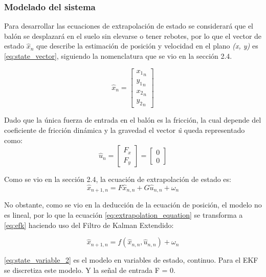 		\subsubsection*{Modelado del sistema}
Para desarrollar las ecuaciones de extrapolación de estado se considerará que el balón se desplazará en el suelo sin elevarse o tener rebotes, por lo que el vector de estado $\hat{x}_n$ que describe la estimación de posición y velocidad en el plano \textit{(x, y)} es \ref{eq:state_vector}, siguiendo la nomenclatura que se vio en la sección 2.4.

\begin{equation}
\hat{x}_n = \begin{bmatrix}
{x_1}_n\\ 
{y_1}_n\\ 
{x_2}_n\\ 
{y_2}_n
\end{bmatrix}
\label{eq:state_vector}
\end{equation}

Dado que la única fuerza de entrada en el balón es la fricción, la cual depende del coeficiente de fricción dinámica y la gravedad el vector \textit{û} queda representado como:
\begin{equation}
\hat{u}_n = \begin{bmatrix}
F_x\\
F_y
\end{bmatrix} = 
\begin{bmatrix}
0\\
0
\end{bmatrix}
\label{eq:input_signal}
\end{equation}


Como se vio en la sección 2.4, la ecuación de extrapolación de estado es:
\begin{equation}
\hat{x}_{n+1,n} = F \hat{x}_{n,n} + G \hat{u}_{n,n} + \omega_n
\label{eq:extrapolation_equation}
\end{equation}

No obstante, como se vio en la deducción de la ecuación de posición, el modelo no es lineal, por lo que la ecuación \ref{eq:extrapolation_equation} se transforma a \ref{eq:efk} haciendo uso del Filtro de Kalman Extendido:

\begin{equation}
\hat{x}_{n+1,n} = f(\hat{x}_{n,n}, \hat{u}_{n,n}) + \omega_n
\label{eq:efk}
\end{equation}


\ref{eq:state_variable_2} es el modelo en variables de estado, continuo. Para el EKF se discretiza este modelo. Y la señal de entrada F = 0. 

